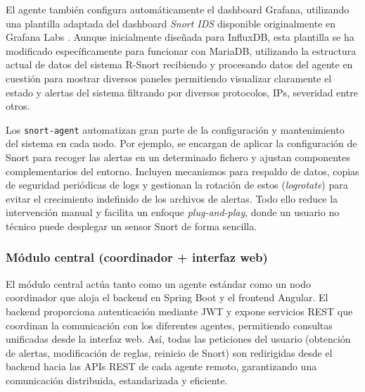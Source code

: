 \documentclass[11pt,a4paper,twoside]{report}
\begin{document}
El agente también configura automáticamente el dashboard Grafana, utilizando una plantilla adaptada del dashboard \textit{Snort IDS} disponible originalmente en Grafana Labs \cite{grafana-snort-dashboard}. Aunque inicialmente diseñada para InfluxDB, esta plantilla se ha modificado específicamente para funcionar con MariaDB, utilizando la estructura actual de datos del sistema R-Snort recibiendo y procesando datos del agente en cuestión para mostrar diversos paneles permitiendo visualizar claramente el estado y alertas del sistema filtrando por diversos protocolos, IPs, severidad entre otros.\newline

Los \texttt{snort-agent} automatizan gran parte de la configuración y mantenimiento del sistema en cada nodo. Por ejemplo, se encargan de aplicar la configuración de Snort para recoger las alertas en un determinado fichero y ajustan componentes complementarios del entorno. Incluyen mecanismos para respaldo de datos, copias de seguridad periódicas de logs y gestionan la rotación de estos (\emph{logrotate}) para evitar el crecimiento indefinido de los archivos de alertas. Todo ello reduce la intervención manual y facilita un enfoque \emph{plug-and-play}, donde un usuario no técnico puede desplegar un sensor Snort de forma sencilla.\newline

\subsubsection{Módulo central (coordinador + interfaz web)}

El módulo central actúa tanto como un agente estándar como un nodo coordinador que aloja el backend en Spring Boot y el frontend Angular. El backend proporciona autenticación mediante JWT y expone servicios REST que coordinan la comunicación con los diferentes agentes, permitiendo consultas unificadas desde la interfaz web. Así, todas las peticiones del usuario (obtención de alertas, modificación de reglas, reinicio de Snort) son redirigidas desde el backend hacia las APIs REST de cada agente remoto, garantizando una comunicación distribuida, estandarizada y eficiente. \newline
\end{document}
